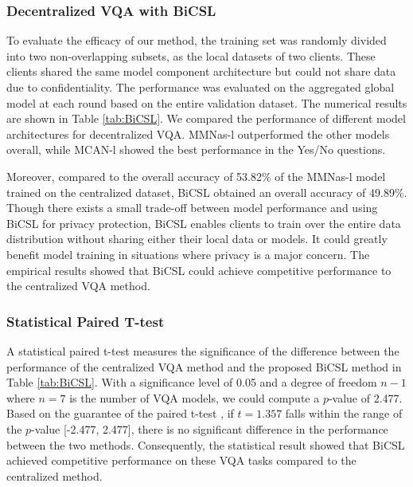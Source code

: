 \documentclass[letterpaper]{article} %
\begin{document}


\subsubsection{Decentralized VQA with BiCSL}

To evaluate the efficacy of our method, the training set was randomly divided into two non-overlapping subsets, as the local datasets of two clients. These clients shared the same model component architecture but could not share data due to confidentiality. The performance was evaluated on the aggregated global model at each round based on the entire validation dataset. The numerical results are shown in Table \ref{tab:BiCSL}. We compared the performance of different model architectures for decentralized VQA. MMNas-l outperformed the other models overall, while MCAN-l showed the best performance in the Yes/No questions.

Moreover, compared to the overall accuracy of 53.82\% of the MMNas-l model trained on the centralized dataset, BiCSL obtained an overall accuracy of 49.89\%. Though there exists a small trade-off between model performance and using BiCSL for privacy protection, BiCSL enables clients to train over the entire data distribution without sharing either their local data or models. It could greatly benefit model training in situations where privacy is a major concern. The empirical results showed that BiCSL could achieve competitive performance to the centralized VQA method.

\subsubsection{Statistical Paired T-test}
A statistical paired t-test \cite{t-test} measures the significance of the difference between the performance of the centralized VQA method and the proposed BiCSL method in Table \ref{tab:BiCSL}. With a significance level of 0.05 and a degree of freedom $n-1$ where $n=7$ is the number of VQA models, we could compute a $p$-value of 2.477. Based on the guarantee of the paired t-test \cite{t-test}, if $t=1.357$ falls within the range of the $p$-value [-2.477, 2.477], there is no significant difference in the performance between the two methods. Consequently, the statistical result showed that BiCSL achieved competitive performance on these VQA tasks compared to the centralized method.
\end{document}
